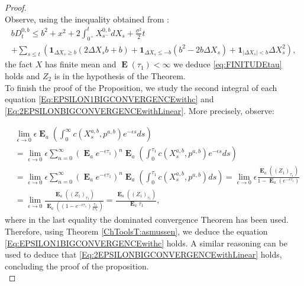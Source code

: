 \documentclass{article}
\newcommand\E{\operatorname{\mathbf{E}}}
\begin{document}
\begin{proof}
\begin{equation*}
\end{equation*}
Observe, using the inequality obtained from \cite[Theorem 6.3, equation (70)]{AAGP}:
\begin{multline*}
    b D^{0,b}_t  \leq b^2+x^2  +2\int_{0^+}^t X^{0,b}_{s^-}dX_s+\frac{\sigma^2}{2}t \\ + \sum_{s \leq t} \left(\mathbf{1}_{\Delta X_s \geq b} (2 \Delta X_s b+b) 
    + \mathbf{1}_{\Delta X_s \leq -b}(b^2 -2b \Delta X_s)+ \mathbf{1}_{\vert \Delta X_s \vert <b } \Delta X_s^2 \right),
\end{multline*}
the fact $X$ has finite mean and  $\E (\tau_1)<\infty$ we deduce \eqref{eq:FINITUDEtau} holds and $Z_2$ is in the hypothesis of the Theorem. \\
 To finish the proof of the Proposition, we study the second integral of each equation \eqref{Eq:EPSILON1BIGCONVERGENCEwithc}  and \eqref{Eq:2EPSILONBIGCONVERGENCEwithLinear}. More precisely, observe:
 
\begin{align*}
&\lim_{\epsilon \to 0}\epsilon \E_a \left( \int_0^{\infty} c(X_s^{a,b},p^{a,b})e^{-\epsilon s}ds \right)
\\ &=\lim_{\epsilon \to 0} \epsilon \sum_{n=0}^{\infty}  \left(\E_a e^{-\epsilon \tau_1} \right)^n   \E_a \left( \int_0^{\tau_1}c(X_s^{a,b},p^{a,b}) e^{-\epsilon s}ds\right) \\ &=\lim_{\epsilon \to 0} \epsilon \sum_{n=0}^{\infty}  \left(\E_a e^{-\epsilon \tau_1} \right)^n   \E_a \left( \int_0^{\tau_1}c(X_s^{a,b},p^{a,b}) ds\right)
= \lim_{\epsilon \to 0} \epsilon \frac{\displaystyle \E_a \left( (Z_1)_{\tau_1} \right)}{\displaystyle 1-\E_a(e^{-\epsilon \tau_1})}\\ &= \lim_{\epsilon \to 0} \frac{\displaystyle \E_a \left( (Z_1)_{\tau_1} \right)}{\displaystyle \E_a \left( \left(1-e^{-\epsilon \tau_1}\right) \frac{\tau_1}{\epsilon \tau_1} \right)}= \frac{\displaystyle  \E_a \left( (Z_{1})_{\tau_1} \right) }{\E_a \tau_1},
\end{align*}
where in the last equality the dominated convergence Theorem has been used. Therefore, using Theorem \ref{ChToolsT:asmussen}, we deduce the equation \eqref{Eq:EPSILON1BIGCONVERGENCEwithc} holds. A similar reasoning can be used to deduce that \eqref{Eq:2EPSILONBIGCONVERGENCEwithLinear}  holds, concluding the proof of the proposition.\\
\end{proof} 
\end{document}
